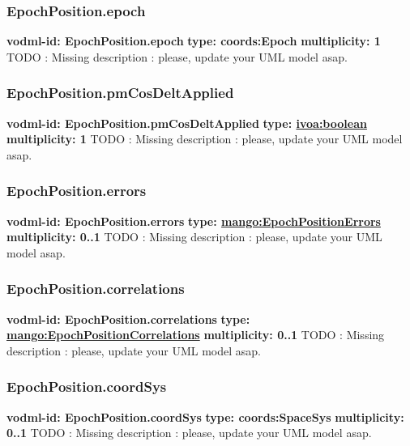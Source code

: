     \subsubsection{EpochPosition.epoch}
      \textbf{vodml-id: EpochPosition.epoch} \newline
      \textbf{type: coords:Epoch} \newline
      \textbf{multiplicity: 1} \newline 
      TODO : Missing description : please, update your UML model asap.

    \subsubsection{EpochPosition.pmCosDeltApplied}
      \textbf{vodml-id: EpochPosition.pmCosDeltApplied} \newline
      \textbf{type: \hyperref[sect:ivoa]{ivoa:boolean}} \newline
      \textbf{multiplicity: 1} \newline 
      TODO : Missing description : please, update your UML model asap.

    \subsubsection{EpochPosition.errors}
      \textbf{vodml-id: EpochPosition.errors} \newline
      \textbf{type: \hyperref[sect:EpochPositionErrors]{mango:EpochPositionErrors}} \newline
      \textbf{multiplicity: 0..1} \newline 
      TODO : Missing description : please, update your UML model asap.

    \subsubsection{EpochPosition.correlations}
      \textbf{vodml-id: EpochPosition.correlations} \newline
      \textbf{type: \hyperref[sect:EpochPositionCorrelations]{mango:EpochPositionCorrelations}} \newline
      \textbf{multiplicity: 0..1} \newline 
      TODO : Missing description : please, update your UML model asap.

    \subsubsection{EpochPosition.coordSys}
      \textbf{vodml-id: EpochPosition.coordSys} \newline
      \textbf{type: coords:SpaceSys} \newline
      \textbf{multiplicity: 0..1} \newline 
      TODO : Missing description : please, update your UML model asap.

